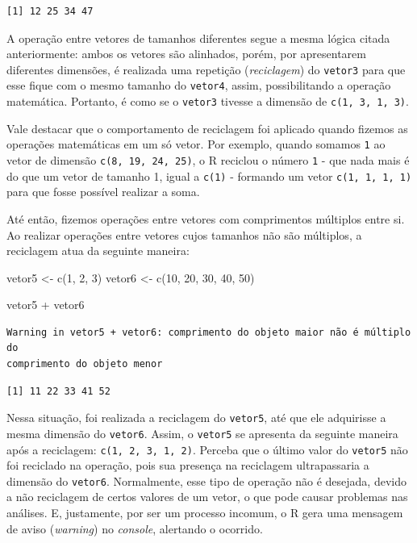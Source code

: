 \documentclass[
  brazilian,
]{book}
\newenvironment{Shaded}{\begin{snugshade}}{\end{snugshade}}
\newcommand{\DecValTok}[1]{\textcolor[rgb]{0.00,0.00,0.81}{#1}}
\newcommand{\FunctionTok}[1]{\textcolor[rgb]{0.00,0.00,0.00}{#1}}
\newcommand{\NormalTok}[1]{#1}
\newcommand{\OtherTok}[1]{\textcolor[rgb]{0.56,0.35,0.01}{#1}}
\newcommand{\SpecialCharTok}[1]{\textcolor[rgb]{0.00,0.00,0.00}{#1}}
\begin{document}
\begin{verbatim}
[1] 12 25 34 47
\end{verbatim}

A operação entre vetores de tamanhos diferentes segue a mesma lógica citada anteriormente: ambos os vetores são alinhados, porém, por apresentarem diferentes dimensões, é realizada uma repetição (\emph{reciclagem}) do \texttt{vetor3} para que esse fique com o mesmo tamanho do \texttt{vetor4}, assim, possibilitando a operação matemática. Portanto, é como se o \texttt{vetor3} tivesse a dimensão de \texttt{c(1,\ 3,\ 1,\ 3)}.

Vale destacar que o comportamento de reciclagem foi aplicado quando fizemos as operações matemáticas em um só vetor. Por exemplo, quando somamos \texttt{1} ao vetor de dimensão \texttt{c(8,\ 19,\ 24,\ 25)}, o R reciclou o número \texttt{1} - que nada mais é do que um vetor de tamanho 1, igual a \texttt{c(1)} - formando um vetor \texttt{c(1,\ 1,\ 1,\ 1)} para que fosse possível realizar a soma.

Até então, fizemos operações entre vetores com comprimentos múltiplos entre si. Ao realizar operações entre vetores cujos tamanhos não são múltiplos, a reciclagem atua da seguinte maneira:

\begin{Shaded}
\begin{Highlighting}[]
\NormalTok{vetor5 }\OtherTok{\textless{}{-}} \FunctionTok{c}\NormalTok{(}\DecValTok{1}\NormalTok{, }\DecValTok{2}\NormalTok{, }\DecValTok{3}\NormalTok{)}
\NormalTok{vetor6 }\OtherTok{\textless{}{-}} \FunctionTok{c}\NormalTok{(}\DecValTok{10}\NormalTok{, }\DecValTok{20}\NormalTok{, }\DecValTok{30}\NormalTok{, }\DecValTok{40}\NormalTok{, }\DecValTok{50}\NormalTok{)}

\NormalTok{vetor5 }\SpecialCharTok{+}\NormalTok{ vetor6}
\end{Highlighting}
\end{Shaded}

\begin{verbatim}
Warning in vetor5 + vetor6: comprimento do objeto maior não é múltiplo do
comprimento do objeto menor
\end{verbatim}

\begin{verbatim}
[1] 11 22 33 41 52
\end{verbatim}

Nessa situação, foi realizada a reciclagem do \texttt{vetor5}, até que ele adquirisse a mesma dimensão do \texttt{vetor6}. Assim, o \texttt{vetor5} se apresenta da seguinte maneira após a reciclagem: \texttt{c(1,\ 2,\ 3,\ 1,\ 2)}. Perceba que o último valor do \texttt{vetor5} não foi reciclado na operação, pois sua presença na reciclagem ultrapassaria a dimensão do \texttt{vetor6}. Normalmente, esse tipo de operação não é desejada, devido a não reciclagem de certos valores de um vetor, o que pode causar problemas nas análises. E, justamente, por ser um processo incomum, o R gera uma mensagem de aviso (\emph{warning}) no \emph{console}, alertando o ocorrido.
\end{document}
